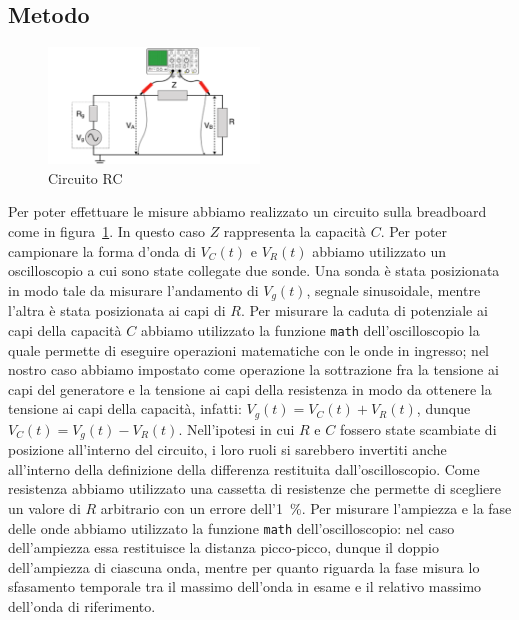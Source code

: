 \documentclass[a4paper]{article}
\begin{document}
\subsection{Metodo}
\begin{figure}[htbp]
	\centering
	\includegraphics[width=0.5\textwidth]{grafici/circuito-rc.png}
	\caption{Circuito RC}
	\label{fig:rc_circuito}
\end{figure}
Per poter effettuare le misure abbiamo realizzato un circuito sulla breadboard come in figura~\ref{fig:rc_circuito}. In questo caso $Z$ rappresenta la capacità $C$. Per poter campionare la forma d'onda di $V_C(t)$ e $V_R(t)$ abbiamo utilizzato un oscilloscopio a cui sono state collegate due sonde. Una sonda è stata posizionata in modo tale da misurare l'andamento di $V_g(t)$, segnale sinusoidale, mentre l'altra è stata posizionata ai capi di $R$. Per misurare la caduta di potenziale ai capi della capacità $C$ abbiamo utilizzato la funzione \texttt{math} dell'oscilloscopio la quale permette di eseguire operazioni matematiche con le onde in ingresso; nel nostro caso abbiamo impostato come operazione la sottrazione fra la tensione ai capi del generatore e la tensione ai capi della resistenza in modo da ottenere la tensione ai capi della capacità, infatti:
$V_g(t) = V_C(t) + V_R(t)$, dunque $V_C(t) = V_g(t) - V_R(t)$. Nell'ipotesi in cui $R$ e $C$ fossero state scambiate di posizione all'interno del circuito, i loro ruoli si sarebbero invertiti anche all'interno della definizione della differenza restituita dall'oscilloscopio.
Come resistenza abbiamo utilizzato una cassetta di resistenze che permette di scegliere un valore di $R$ arbitrario con un errore dell'\SI{1}{\percent}. Per misurare l'ampiezza e la fase delle onde abbiamo utilizzato la funzione \texttt{math} dell'oscilloscopio: nel caso dell'ampiezza essa restituisce la distanza picco-picco, dunque il doppio dell'ampiezza di ciascuna onda, mentre per quanto riguarda la fase misura lo sfasamento temporale tra il massimo dell'onda in esame e il relativo massimo dell'onda di riferimento.
\end{document}
